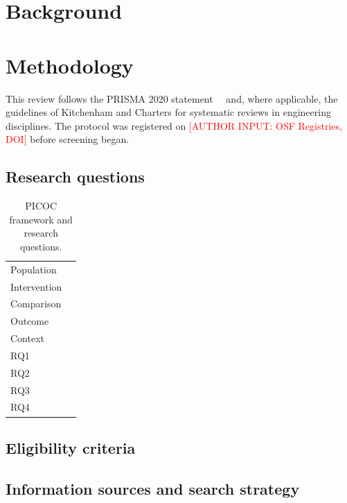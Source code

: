 \documentclass[11pt,a4paper]{article}
\newcommand{\authorinput}[1]{\textcolor{red}{[AUTHOR INPUT: #1]}}
\begin{document}
\section{Background}\label{sec:background}

\section{Methodology}\label{sec:method}
This review follows the PRISMA 2020 statement~\cite{page2021prisma}%
\ and, where applicable, the guidelines of Kitchenham and Charters for systematic reviews in engineering disciplines. The protocol was registered on \authorinput{OSF Registries, DOI} before screening began.

\subsection{Research questions}
\begin{table}[h]
\centering\small
\caption{PICOC framework and research questions.}\label{tab:picoc}
\begin{tabularx}{\linewidth}{@{}l X@{}}
\toprule
Population & \\ Intervention & \\ Comparison & \\ Outcome & \\ Context & \\
\midrule
RQ1 & \\ RQ2 & \\ RQ3 & \\ RQ4 & \\
\bottomrule
\end{tabularx}
\end{table}

\subsection{Eligibility criteria}

\subsection{Information sources and search strategy}
\end{document}

